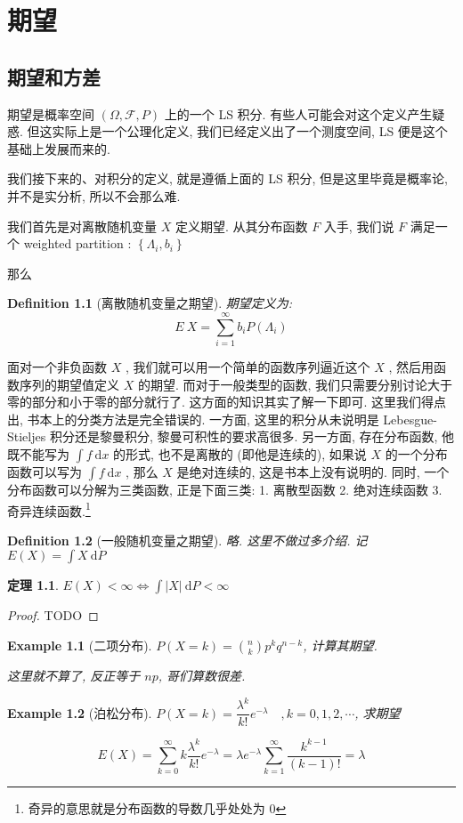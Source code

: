 \documentclass[a4paper, 10pt]{ctexbook} %
\newtheorem{theorem}{定理}
\newtheorem{example}{Example}
\newtheorem{definition}{Definition}
\begin{document}
    \tableofcontents
    \newpage
    \chapter{期望}
    \section{期望和方差}
    期望是概率空间 $\left( \Omega , \mathcal F, P\right)$ 上的一个 LS 积分. 有些人可能会对这个定义产生疑惑. 但这实际上是一个公理化定义, 
    我们已经定义出了一个测度空间, LS 便是这个基础上发展而来的.

    我们接下来的、对积分的定义, 就是遵循上面的 LS 积分, 但是这里毕竟是概率论, 并不是实分析, 所以不会那么难. 

    我们首先是对离散随机变量 $X$ 定义期望. 从其分布函数 $F$ 入手, 我们说 $F$ 满足一个 weighted partition : $\left\{\Lambda _{i} , b_i\right\}$

    那么
    \begin{definition}[离散随机变量之期望]
        期望定义为: 
    \[
    E\ X = \sum_{i=1} ^{\infty} b_i P\left(\Lambda _{i}\right) 
    \]
    \end{definition}

    面对一个非负函数 $X$ , 我们就可以用一个简单的函数序列逼近这个 $X$ , 然后用函数序列的期望值定义 $X$ 的期望. 而对于一般类型的函数, 我们只需要分别讨论大于零的部分和小于零的部分就行了. 这方面的知识其实了解一下即可. 这里我们得点出, 书本上的分类方法是完全错误的. 
    一方面, 这里的积分从未说明是 Lebesgue-Stieljes 积分还是黎曼积分, 黎曼可积性的要求高很多. 
    另一方面, 存在分布函数, 他既不能写为 $\int  f \ \mathrm{d}x$ 的形式, 也不是离散的 (即他是连续的), 
    如果说 $X$ 的一个分布函数可以写为 $\int  f \ \mathrm{d}x$ , 
    那么 $X$ 是绝对连续的, 这是书本上没有说明的. 同时, 一个分布函数可以分解为三类函数, 
    正是下面三类: 1. 离散型函数 2. 绝对连续函数 3. 奇异连续函数.\footnote{奇异的意思就是分布函数的导数几乎处处为 $0$}

    \begin{definition}[一般随机变量之期望]
        略. 这里不做过多介绍. 记 $E \left(X\right) = \int  X \ \mathrm{d}P$
    \end{definition}
    \begin{theorem}
        $E \left(X\right) < \infty \iff  \int \left| X \right| \ \mathrm{d}P < \infty$
    \end{theorem}
    \begin{proof}
        TODO
    \end{proof}
    \begin{example}[二项分布]
        $P\left(X = k \right) =\displaystyle  \binom{n}{k} p^{k}q ^{n-k}$, 计算其期望. 

        这里就不算了, 反正等于 $np$, 哥们算数很差.
    \end{example}
    \begin{example}[泊松分布]
        $P\left(X = k\right) = \dfrac{\lambda ^{k}}{k!} e^{-\lambda}\quad , k =0,1,2,\cdots$, 求期望 

        \[
        E \left(X\right) = \sum_{k=0}^{\infty} k \frac{\lambda ^{k}}{k!} e ^{-\lambda} = \lambda e ^{-\lambda} \sum_{k=1}^{\infty} \frac{k ^{k-1}}{\left(k-1\right)!} = \lambda 
        \]
    \end{example}
\end{document}
